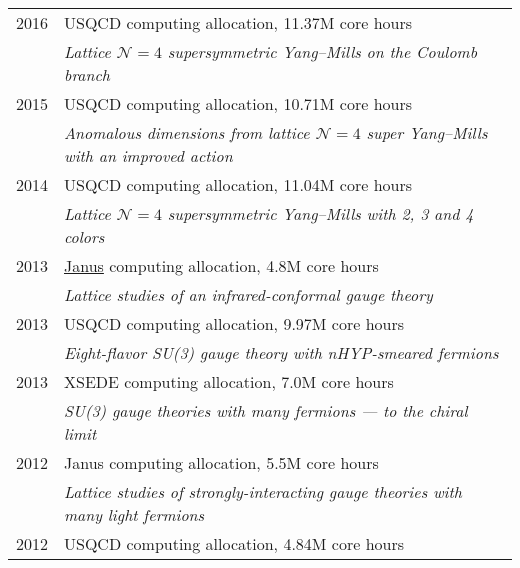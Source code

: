 \begin{spacelistout}
\begin{tabular}[t]{cl}
      2016 & USQCD computing allocation, 11.37M core hours                                                            \\ %
           & \textit{Lattice $\mathcal N = 4$ supersymmetric Yang--Mills on the Coulomb branch}                       \\[6 pt]
      2015 & USQCD computing allocation, 10.71M core hours                                                            \\ %
           & \textit{Anomalous dimensions from lattice $\mathcal N = 4$ super Yang--Mills with an improved action}    \\[6 pt]
      2014 & USQCD computing allocation, 11.04M core hours                                                            \\ %
           & \textit{Lattice $\mathcal N = 4$ supersymmetric Yang--Mills with 2, 3 and 4 colors}                      \\[6 pt]
      2013 & \href{https://www.top500.org/system/176922}{Janus} computing allocation, 4.8M core hours                 \\ %
           & \textit{Lattice studies of an infrared-conformal gauge theory}                                           \\[6 pt]
      2013 & USQCD computing allocation, 9.97M core hours                                                             \\ %
           & \textit{Eight-flavor SU(3) gauge theory with nHYP-smeared fermions}                                      \\[6 pt]
      2013 & XSEDE computing allocation, 7.0M core hours                                                              \\ %
           & \textit{SU(3) gauge theories with many fermions --- to the chiral limit}                                 \\[6 pt]
      2012 & Janus computing allocation, 5.5M core hours                                                              \\ %
           & \textit{Lattice studies of strongly-interacting gauge theories with many light fermions}                 \\[6 pt]
      2012 & USQCD computing allocation, 4.84M core hours                                                             \\ %

\end{tabular}
\end{spacelistout}
